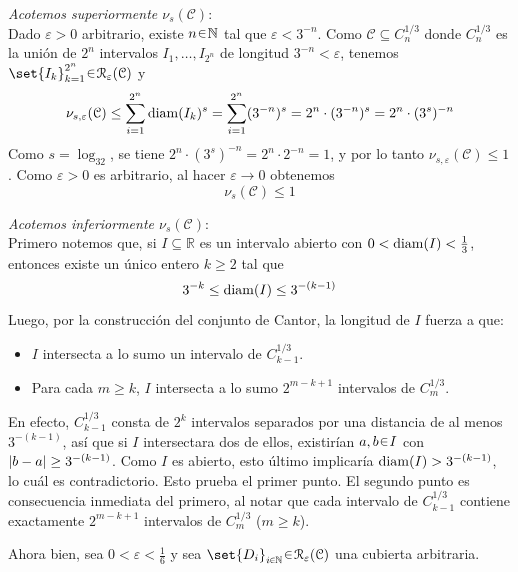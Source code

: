 \begin{sol}
\begin{enumerate}[label = (\roman*), leftmargin=1.5em]
\medskip
\emph{Acotemos superiormente $\nu_s(\mathcal{C})$}:\\
Dado $\varepsilon>0$ arbitrario, existe $n \en \mathbb{N}$ tal que $\varepsilon<3^{-n}$. Como $\mathcal{C} \subseteq C^{1/3}_n$ donde $C^{1/3}_n$ es la unión de $2^n$ intervalos $I_1,\dots,I_{2^n}$ de longitud $3^{-n}< \varepsilon$, tenemos $\set{I_k}^{2^n}_{k=1} \en \mathcal{R}_{\varepsilon}(\mathcal{C})$ y
\[
\nu_{s,\varepsilon}(\mathcal{C})
\le \sum_{i=1}^{2^n} \operatorname{diam}(I_k)^s
= \sum_{i=1}^{2^n} (3^{-n})^s
= 2^n \cdot (3^{-n})^s
= 2^n \cdot (3^{s})^{-n}
\]
Como $s = \log_32$, se tiene $2^n \cdot (3^{s})^{-n} = 2^n\cdot2^{-n} = 1$, y por lo tanto $\nu_{s,\varepsilon}(\mathcal{C}) \le 1$. Como $\varepsilon>0$ es arbitrario, al hacer $\varepsilon \to 0$ obtenemos
\[
\nu_s(\mathcal{C}) \le 1
\]

\medskip
\emph{Acotemos inferiormente $\nu_s(\mathcal{C})$}:\\
Primero notemos que, si $I \subseteq \mathbb{R}$ es un intervalo abierto con $0 < \operatorname{diam}(I) < \tfrac{1}{3}$, entonces existe un único entero $k \ge 2$ tal que
\[
3^{-k} \le \operatorname{diam}(I) \le 3^{-(k-1)}
\]
Luego, por la construcción del conjunto de Cantor, la longitud de $I$ fuerza a que:%
\begin{itemize}[leftmargin=1em]
    \item $I$ intersecta a lo sumo un intervalo de $C^{1/3}_{k-1}$.
    \item Para cada $m \ge k$, $I$ intersecta a lo sumo $2^{m-k+1}$ intervalos de $C^{1/3}_m$.
\end{itemize}
En efecto, $C^{1/3}_{k-1}$ consta de $2^k$ intervalos separados por una distancia de al menos $3^{-(k-1)}$, así que si $I$ intersectara dos de ellos, existirían $a,b\en I$ con $\abs{b-a} \ge 3^{-(k-1)}$. Como $I$ es abierto, esto último implicaría $\operatorname{diam}(I) > 3^{-(k-1)}$, lo cuál es contradictorio. Esto prueba el primer punto. El segundo punto es consecuencia inmediata del primero, al notar que cada intervalo de $C^{1/3}_{k-1}$ contiene exactamente $2^{m-k+1}$ intervalos de $C^{1/3}_{m}$ ($m\ge k$).

\medskip
Ahora bien, sea $0 < \varepsilon < \tfrac{1}{6}$ y sea $\set{D_i}_{i\en\mathbb{N}} \en \mathcal{R}_\varepsilon(\mathcal{C})$ una cubierta arbitraria.


\end{enumerate}
\end{sol}
